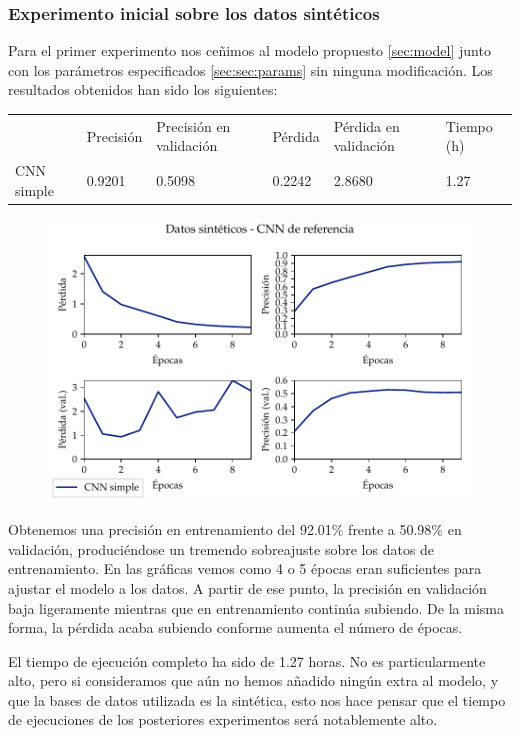 \documentclass[a4paper, 20pt, dvipsnames]{article}
\begin{document}
\subsubsection{Experimento inicial sobre los datos sintéticos}
\label{exp:toy1}

Para el primer experimento nos ceñimos al modelo propuesto \ref{sec:model} junto
con los parámetros especificados \ref{sec:sec:params} sin ninguna
modificación. Los resultados obtenidos han sido los siguientes:

\begin{table}[H]
	\centering
	\begin{tabular}{llllll}
		& Precisión & Precisión en validación & Pérdida & Pérdida en validación & Tiempo (h) \\ \cline{2-6} 
		CNN simple & 0.9201    & 0.5098                  & 0.2242  & 2.8680                & 1.27      
	\end{tabular}
\end{table}

\begin{figure}[H]
	\centering
	\includegraphics{fig/toy-1.pdf}
\end{figure}

Obtenemos una precisión en entrenamiento del 92.01\% frente a 50.98\% en
validación, produciéndose un tremendo sobreajuste sobre los datos de
entrenamiento. En las gráficas vemos como 4 o 5 épocas eran suficientes para
ajustar el modelo a los datos. A partir de ese punto, la precisión en validación
baja ligeramente mientras que en entrenamiento continúa subiendo. De la misma
forma, la pérdida acaba subiendo conforme aumenta el número de épocas.

El tiempo de ejecución completo ha sido de 1.27 horas. No es particularmente
alto, pero si consideramos que aún no hemos añadido ningún extra al modelo, y
que la bases de datos utilizada es la sintética, esto nos hace pensar que el
tiempo de ejecuciones de los posteriores experimentos será notablemente alto.
\end{document}
